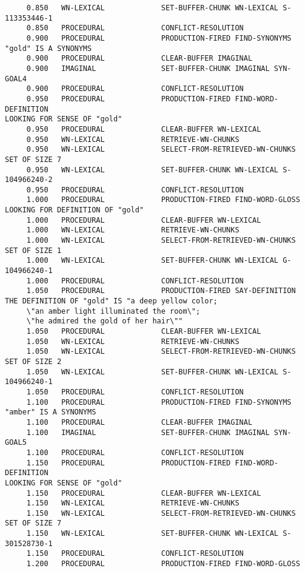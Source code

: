 \begin{verbatim}
     0.850   WN-LEXICAL             SET-BUFFER-CHUNK WN-LEXICAL S-113353446-1 
     0.850   PROCEDURAL             CONFLICT-RESOLUTION 
     0.900   PROCEDURAL             PRODUCTION-FIRED FIND-SYNONYMS 
"gold" IS A SYNONYMS 
     0.900   PROCEDURAL             CLEAR-BUFFER IMAGINAL 
     0.900   IMAGINAL               SET-BUFFER-CHUNK IMAGINAL SYN-GOAL4 
     0.900   PROCEDURAL             CONFLICT-RESOLUTION 
     0.950   PROCEDURAL             PRODUCTION-FIRED FIND-WORD-DEFINITION 
LOOKING FOR SENSE OF "gold" 
     0.950   PROCEDURAL             CLEAR-BUFFER WN-LEXICAL 
     0.950   WN-LEXICAL             RETRIEVE-WN-CHUNKS 
     0.950   WN-LEXICAL             SELECT-FROM-RETRIEVED-WN-CHUNKS SET OF SIZE 7 
     0.950   WN-LEXICAL             SET-BUFFER-CHUNK WN-LEXICAL S-104966240-2 
     0.950   PROCEDURAL             CONFLICT-RESOLUTION 
     1.000   PROCEDURAL             PRODUCTION-FIRED FIND-WORD-GLOSS 
LOOKING FOR DEFINITION OF "gold" 
     1.000   PROCEDURAL             CLEAR-BUFFER WN-LEXICAL 
     1.000   WN-LEXICAL             RETRIEVE-WN-CHUNKS 
     1.000   WN-LEXICAL             SELECT-FROM-RETRIEVED-WN-CHUNKS SET OF SIZE 1 
     1.000   WN-LEXICAL             SET-BUFFER-CHUNK WN-LEXICAL G-104966240-1 
     1.000   PROCEDURAL             CONFLICT-RESOLUTION 
     1.050   PROCEDURAL             PRODUCTION-FIRED SAY-DEFINITION 
THE DEFINITION OF "gold" IS "a deep yellow color; 
     \"an amber light illuminated the room\"; 
     \"he admired the gold of her hair\"" 
     1.050   PROCEDURAL             CLEAR-BUFFER WN-LEXICAL 
     1.050   WN-LEXICAL             RETRIEVE-WN-CHUNKS 
     1.050   WN-LEXICAL             SELECT-FROM-RETRIEVED-WN-CHUNKS SET OF SIZE 2 
     1.050   WN-LEXICAL             SET-BUFFER-CHUNK WN-LEXICAL S-104966240-1 
     1.050   PROCEDURAL             CONFLICT-RESOLUTION 
     1.100   PROCEDURAL             PRODUCTION-FIRED FIND-SYNONYMS 
"amber" IS A SYNONYMS 
     1.100   PROCEDURAL             CLEAR-BUFFER IMAGINAL 
     1.100   IMAGINAL               SET-BUFFER-CHUNK IMAGINAL SYN-GOAL5 
     1.100   PROCEDURAL             CONFLICT-RESOLUTION 
     1.150   PROCEDURAL             PRODUCTION-FIRED FIND-WORD-DEFINITION 
LOOKING FOR SENSE OF "gold" 
     1.150   PROCEDURAL             CLEAR-BUFFER WN-LEXICAL 
     1.150   WN-LEXICAL             RETRIEVE-WN-CHUNKS 
     1.150   WN-LEXICAL             SELECT-FROM-RETRIEVED-WN-CHUNKS SET OF SIZE 7 
     1.150   WN-LEXICAL             SET-BUFFER-CHUNK WN-LEXICAL S-301528730-1 
     1.150   PROCEDURAL             CONFLICT-RESOLUTION 
     1.200   PROCEDURAL             PRODUCTION-FIRED FIND-WORD-GLOSS 

\end{verbatim}
